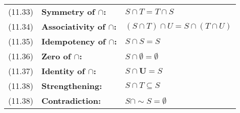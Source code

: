 \documentclass[letterpaper, 8pt]{extarticle}
\begin{document}
\begin{multicols*}{3}
    \begin{tabulary}{\linewidth}{@{}lLL@{}}
        (11.33) & \textbf{Symmetry of $\cap$:} & $S \cap T = T \cap S$ \\
        (11.34) & \textbf{Associativity of $\cap$:} & $(S \cap T) \cap U = S \cap (T \cap U)$ \\
        (11.35) & \textbf{Idempotency of $\cap$:} & $S \cap S = S$ \\
        (11.36) & \textbf{Zero of $\cap$:} & $S \cap \emptyset = \emptyset$ \\
        (11.37) & \textbf{Identity of $\cap$:} & $S \cap \mathbf{U} = S$ \\
        (11.38) & \textbf{Strengthening:} & $S \cap T \subseteq S$ \\
        (11.38) & \textbf{Contradiction:} & $S \cap \sim S = \emptyset$ \\
    \end{tabulary}

\end{multicols*}
\end{document}
